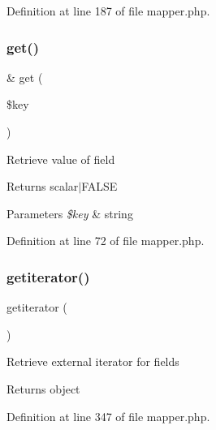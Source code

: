 Definition at line 187 of file mapper.\+php.

\hypertarget{class_d_b_1_1_mongo_1_1_mapper_ac3695923790b06917410e205068b8376}{}\label{class_d_b_1_1_mongo_1_1_mapper_ac3695923790b06917410e205068b8376} 
\subsubsection{\texorpdfstring{get()}{get()}}
{\footnotesize\ttfamily \& get (\begin{DoxyParamCaption}\item[{}]{\$key }\end{DoxyParamCaption})}

Retrieve value of field \begin{DoxyReturn}{Returns}
scalar$\vert$\+F\+A\+L\+SE 
\end{DoxyReturn}

\begin{DoxyParams}{Parameters}
{\em \$key} & string \\
\hline
\end{DoxyParams}


Definition at line 72 of file mapper.\+php.

\hypertarget{class_d_b_1_1_mongo_1_1_mapper_a7f835c25df4cb49d02328644722656da}{}\label{class_d_b_1_1_mongo_1_1_mapper_a7f835c25df4cb49d02328644722656da} 
\subsubsection{\texorpdfstring{getiterator()}{getiterator()}}
{\footnotesize\ttfamily getiterator (\begin{DoxyParamCaption}{ }\end{DoxyParamCaption})}

Retrieve external iterator for fields \begin{DoxyReturn}{Returns}
object 
\end{DoxyReturn}


Definition at line 347 of file mapper.\+php.

\hypertarget{class_d_b_1_1_mongo_1_1_mapper_a473241246338cfccc4709ba896749019}{}\label{class_d_b_1_1_mongo_1_1_mapper_a473241246338cfccc4709ba896749019} 
